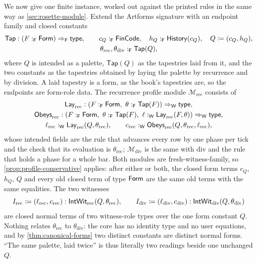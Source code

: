 \documentclass[11pt]{article}
\numberwithin{equation}{section}
\theoremstyle{definition}
\theoremstyle{plain}
\theoremstyle{remark}
\newcommand{\Type}{\mathsf{type}}
\renewcommand{\Form}{\AFForm}
\newcommand{\Hist}{\AFHistory}
\newcommand{\Frm}{\mathsf F}
\newcommand{\Wit}{\mathsf W}
\begin{document}
We now give one finite instance, worked out against the printed rules in
the same way as \cref{sec:rosette-module}.  Extend the Artforms signature with
an endpoint family and closed constants
\[
\begin{gathered}
 \mathsf{Tap}:(F:_{\Frm}\Form)\Rightarrow_{\Frm}\Type,
 \qquad
 c_Q:_{\Frm}\AFFinCode,\quad
 h_Q:_{\Frm}\Hist(c_Q),\quad
 Q\coloneqq(c_Q,h_Q),\\
 \theta_{\mathrm{rec}},\theta_{\mathrm{div}}:_{\Frm}\mathsf{Tap}(Q),
\end{gathered}
\]
where \(Q\) is intended as a palette, \(\mathsf{Tap}(Q)\) as the tapestries
laid from it, and the two constants as the tapestries obtained by laying the
palette by recurrence and by division.  A laid tapestry is a form, as the
book's tapestries are, so the endpoints are form-role data.  The recurrence profile module
\(\mathcal M_{\mathrm{rec}}\) consists of
\[
\begin{gathered}
 \mathsf{Lay}_{\mathrm{rec}}:
  (F:_{\Frm}\Form,\ \theta:_{\Frm}\mathsf{Tap}(F))\Rightarrow_{\Wit}\Type,\\
 \mathsf{Obeys}_{\mathrm{rec}}:
  (F:_{\Frm}\Form,\ \theta:_{\Frm}\mathsf{Tap}(F),\
   \ell:_{\Wit}\mathsf{Lay}_{\mathrm{rec}}(F,\theta))\Rightarrow_{\Wit}\Type,\\
 \ell_{\mathrm{rec}}:_{\Wit}\mathsf{Lay}_{\mathrm{rec}}(Q,\theta_{\mathrm{rec}}),
 \qquad
 c_{\mathrm{rec}}:_{\Wit}
  \mathsf{Obeys}_{\mathrm{rec}}(Q,\theta_{\mathrm{rec}},\ell_{\mathrm{rec}}),
\end{gathered}
\]
whose intended fields are the rule that advances every row by one phase per
tick and the check that its evaluation is \(\theta_{\mathrm{rec}}\);
\(\mathcal M_{\mathrm{div}}\) is the same with \(\mathrm{div}\) and the rule
that holds a phase for a whole bar.  Both modules are fresh-witness-family,
so \cref{prop:profile-conservative} applies: after either or both, the
closed form terms \(c_Q\), \(h_Q\), \(Q\) and every old closed term of
type \(\Form\) are the same old terms with the same equalities.  The two
witnesses
\[
 I_{\mathrm{rec}}\coloneqq(\ell_{\mathrm{rec}},c_{\mathrm{rec}})
 :{\mathsf{IntWit}}_{\mathrm{rec}}(Q,\theta_{\mathrm{rec}}),
 \qquad
 I_{\mathrm{div}}\coloneqq(\ell_{\mathrm{div}},c_{\mathrm{div}})
 :{\mathsf{IntWit}}_{\mathrm{div}}(Q,\theta_{\mathrm{div}})
\]
are closed normal terms of two witness-role types over the one form
constant \(Q\).  Nothing relates \(\theta_{\mathrm{rec}}\) to
\(\theta_{\mathrm{div}}\): the core has no identity type and no user
equations, and by \cref{thm:canonical-forms} two distinct constants are
distinct normal forms.  ``The same palette, laid twice'' is thus literally
two readings beside one unchanged \(Q\).
\end{document}
